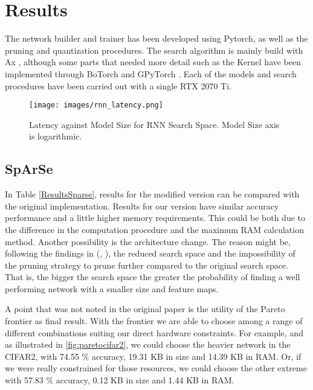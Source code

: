 \documentclass[10pt, a4paper, twocolumn]{article}
\begin{document}
\section{Results}

The network builder and trainer has been developed using Pytorch, as well as the pruning and quantization procedures. The search algorithm is mainly build with Ax \cite{Bakshy2018a}, although some parts that needed more detail such as the Kernel have been implemented through BoTorch \cite{Balandat2019} and GPyTorch \cite{Gardner2018}. Each of the models and search procedures have been carried out with a single RTX 2070 Ti. 

\begin{figure}
	\centering
	\texttt{[image: images/rnn\_latency.png]}
	\caption{Latency against Model Size for RNN Search Space. Model Size axis is logarithmic.  }
	\label{fig:latency}
\end{figure}

\subsection{SpArSe}

In Table \ref{ResultsSparse}, results for the modified version can be compared with the original implementation. Results for our version have similar accuracy performance and a little higher memory requirements. This could be both due to the difference in the computation procedure and the maximum RAM calculation method. Another possibility is the architecture change. The reason might be, following the findings in (\cite{Frankle2019}, \cite{Cai2019f}), the reduced search space and the impossibility of the pruning strategy to prune further compared to the original search space. That is, the bigger the search space the greater the probability of finding a well performing network with a smaller size and feature maps. 

A point that was not noted in the original paper is the utility of the Pareto frontier as final result. With the frontier we are able to choose among a range of different combinations suiting our direct hardware constraints. For example, and as illustrated in \ref{fig:paretocifar2}, we could choose the heavier network in the CIFAR2, with 74.55 $\%$ accuracy, 19.31 KB in size and 14.39 KB in RAM. Or, if we were really constrained for those resources, we could choose the other extreme with 57.83 $\%$ accuracy, 0.12 KB  in size and 1.44 KB in RAM. 
\end{document}

